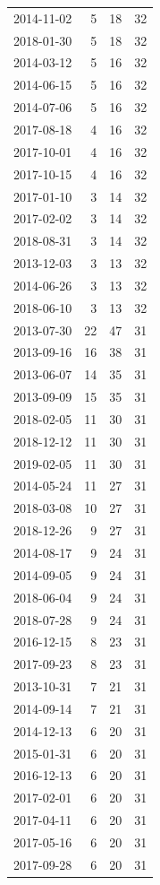 \begin{tabular}{lrrr}
2014-11-02 & 5 & 18 & 32 \\
2018-01-30 & 5 & 18 & 32 \\
2014-03-12 & 5 & 16 & 32 \\
2014-06-15 & 5 & 16 & 32 \\
2014-07-06 & 5 & 16 & 32 \\
2017-08-18 & 4 & 16 & 32 \\
2017-10-01 & 4 & 16 & 32 \\
2017-10-15 & 4 & 16 & 32 \\
2017-01-10 & 3 & 14 & 32 \\
2017-02-02 & 3 & 14 & 32 \\
2018-08-31 & 3 & 14 & 32 \\
2013-12-03 & 3 & 13 & 32 \\
2014-06-26 & 3 & 13 & 32 \\
2018-06-10 & 3 & 13 & 32 \\
2013-07-30 & 22 & 47 & 31 \\
2013-09-16 & 16 & 38 & 31 \\
2013-06-07 & 14 & 35 & 31 \\
2013-09-09 & 15 & 35 & 31 \\
2018-02-05 & 11 & 30 & 31 \\
2018-12-12 & 11 & 30 & 31 \\
2019-02-05 & 11 & 30 & 31 \\
2014-05-24 & 11 & 27 & 31 \\
2018-03-08 & 10 & 27 & 31 \\
2018-12-26 & 9 & 27 & 31 \\
2014-08-17 & 9 & 24 & 31 \\
2014-09-05 & 9 & 24 & 31 \\
2018-06-04 & 9 & 24 & 31 \\
2018-07-28 & 9 & 24 & 31 \\
2016-12-15 & 8 & 23 & 31 \\
2017-09-23 & 8 & 23 & 31 \\
2013-10-31 & 7 & 21 & 31 \\
2014-09-14 & 7 & 21 & 31 \\
2014-12-13 & 6 & 20 & 31 \\
2015-01-31 & 6 & 20 & 31 \\
2016-12-13 & 6 & 20 & 31 \\
2017-02-01 & 6 & 20 & 31 \\
2017-04-11 & 6 & 20 & 31 \\
2017-05-16 & 6 & 20 & 31 \\
2017-09-28 & 6 & 20 & 31 \\

\end{tabular}
